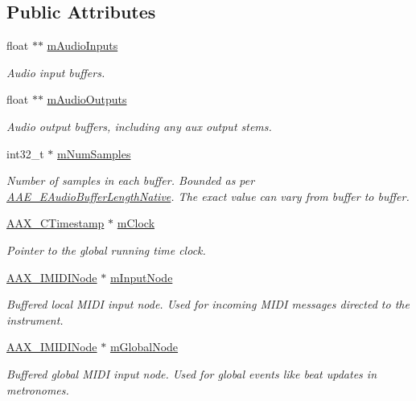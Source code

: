 \subsection*{Public Attributes}
\begin{DoxyCompactItemize}
\item 
float $\ast$$\ast$ \hyperlink{a00123_a84a9670391f6c3ade12f8577e3c127a7}{m\+Audio\+Inputs}
\begin{DoxyCompactList}\small\item\em Audio input buffers. \end{DoxyCompactList}\item 
float $\ast$$\ast$ \hyperlink{a00123_a24be01ad79dac3d110302a4392a8c8cc}{m\+Audio\+Outputs}
\begin{DoxyCompactList}\small\item\em Audio output buffers, including any aux output stems. \end{DoxyCompactList}\item 
int32\+\_\+t $\ast$ \hyperlink{a00123_a7668a9950721f0a2819bee60fafc8e10}{m\+Num\+Samples}
\begin{DoxyCompactList}\small\item\em Number of samples in each buffer. Bounded as per \hyperlink{a00206_aa1769ee466fd07659d8c7ef5ac61cd49}{A\+A\+E\+\_\+\+E\+Audio\+Buffer\+Length\+Native}. The exact value can vary from buffer to buffer. \end{DoxyCompactList}\item 
\hyperlink{a00149_aae7325dbfa53a983f208a68cb563fba5}{A\+A\+X\+\_\+\+C\+Timestamp} $\ast$ \hyperlink{a00123_a4db77b69a4d4993b0fa6a5ab3573eb05}{m\+Clock}
\begin{DoxyCompactList}\small\item\em Pointer to the global running time clock. \end{DoxyCompactList}\item 
\hyperlink{a00105}{A\+A\+X\+\_\+\+I\+M\+I\+D\+I\+Node} $\ast$ \hyperlink{a00123_ab567e317ed0127a51bf0491a4d972f3b}{m\+Input\+Node}
\begin{DoxyCompactList}\small\item\em Buffered local M\+I\+D\+I input node. Used for incoming M\+I\+D\+I messages directed to the instrument. \end{DoxyCompactList}\item 
\hyperlink{a00105}{A\+A\+X\+\_\+\+I\+M\+I\+D\+I\+Node} $\ast$ \hyperlink{a00123_a48eed53d672bf4c844ec501d5dfe1784}{m\+Global\+Node}
\begin{DoxyCompactList}\small\item\em Buffered global M\+I\+D\+I input node. Used for global events like beat updates in metronomes. \end{DoxyCompactList}\item 

\end{DoxyCompactItemize}
